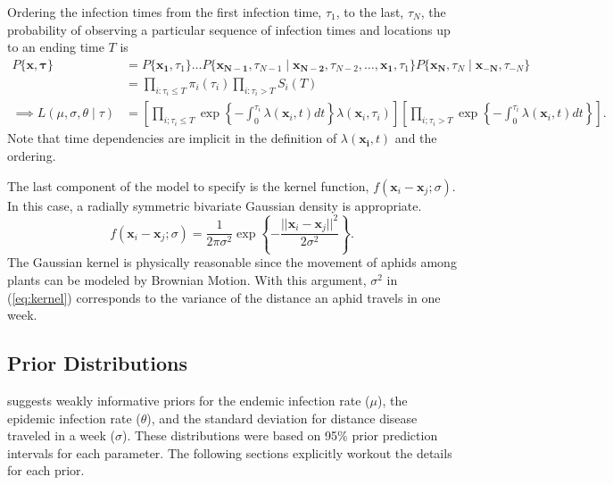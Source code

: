 \documentclass{uwstat572}
\begin{document}
Ordering the infection times from the first infection time, $\tau_1$, to the last, $\tau_N$, the probability of observing a particular sequence of infection times and locations up to an ending time $T$ is
\begin{align*}
P\{\boldsymbol{x}, \boldsymbol{\tau}\} &= P\{\boldsymbol{x_{1}}, \tau_{1} \} \dots P\{\boldsymbol{x_{N-1}}, \tau_{N-1} \mid \boldsymbol{x_{N-2}}, \tau_{N-2}, \dots, \boldsymbol{x_{1}}, \tau_{1} \}  P\{\boldsymbol{x_N}, \tau_N \mid \boldsymbol{x_{-N}}, \tau_{-N} \} \\
	&= \prod_{i: \tau_i \le T} \pi_i(\tau_i)  \prod_{i: \tau_i > T} S_i(T) \\
\implies L(\mu, \sigma, \theta \mid \tau) &= \left[ \prod_{i;\tau_i \le T} \exp \left\{-\int^{\tau_i}_0 \lambda(\boldsymbol{x}_i, t)dt\right \} \lambda(\boldsymbol{x}_i, \tau_i)\right] \left[ \prod_{i;\tau_i > T} \exp \left\{-\int^{\tau_i}_0 \lambda(\boldsymbol{x}_i, t)dt \right\}\right] .
\end{align*}
Note that time dependencies are implicit in the definition of $\lambda(\boldsymbol{x_i}, t)$ and the ordering.

The last component of the model to specify is the kernel function, $f(\boldsymbol{x}_i -\boldsymbol{x}_j; \sigma)$. 
In this case, a radially symmetric bivariate Gaussian density is appropriate. 
\begin{equation} f(\boldsymbol{x}_i-\boldsymbol{x}_j;\sigma) = \frac{1}{2\pi \sigma^2} \exp \left\{-\frac{ ||\boldsymbol{x}_i-\boldsymbol{x}_j||^2}{2\sigma^2} \right\}.
\label{eq:kernel} \end{equation}
The Gaussian kernel is physically reasonable since the movement of aphids among plants can be modeled by Brownian Motion. 
With this argument, $\sigma^2$ in (\ref{eq:kernel}) corresponds to the variance of the distance an aphid travels in one week. 

\subsection{Prior Distributions}
\citet{Brown} suggests weakly informative priors for the endemic infection rate ($\mu$), the epidemic infection rate ($\theta$), and the standard deviation for distance disease traveled in a week ($\sigma$). 
These distributions were based on 95\% prior prediction intervals for each parameter. 
The following sections explicitly workout the details for each prior. 
\end{document}
